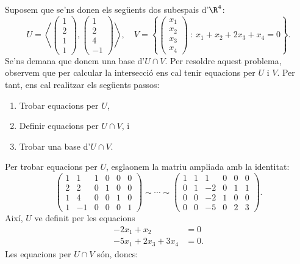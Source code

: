 \begin{exemple}
    Suposem que se'ns donen els següents dos subespais d'$\R^4$:
    \[
    U = \left\langle \begin{pmatrix}1\\2\\1\\1\end{pmatrix},\begin{pmatrix}1\\2\\4\\-1\end{pmatrix}\right\rangle,\quad
    V = \left\{\begin{pmatrix}x_1\\x_2\\x_3\\x_4\end{pmatrix}~\colon ~ x_1 + x_2 + 2x_3 + x_4=0\right\}.
    \]
    Se'ns demana que donem una base d'$U\cap V$. Per resoldre aquest problema, observem que per calcular la intersecció ens cal tenir equacions per $U$ i $V$. Per tant, ens cal realitzar els següents passos:
    \begin{enumerate}
        \item Trobar equacions per $U$,
        \item Definir equacions per $U\cap V$, i
        \item Trobar una base d'$U\cap V$.
    \end{enumerate}
    Per trobar equacions per $U$, esglaonem la matriu ampliada amb la identitat:
    \[
    \left(
    \begin{array}{rr|rrrr}
1 & 1 & 1&0&0&0\\
2&2&0&1&0&0\\
1&4&0&0&1&0\\
1&-1&0&0&0&1
    \end{array}
    \right)\sim\cdots\sim    \left(
    \begin{array}{rr|rrrr}
1&1&1&0&0&0\\
0&1&-2&0&1&1\\\hline
0&0&-2&1&0&0\\
0&0&-5&0&2&3
    \end{array}
    \right).
    \]
    Així, $U$ ve definit per les equacions
    \begin{align*}
    -2x_1+x_2 &= 0\\
    -5x_1 +2x_3+3x_4&=0.
        \end{align*}
    Les equacions per $U\cap V$ són, doncs:
    \begin{align*}

\end{align*}
\end{exemple}
